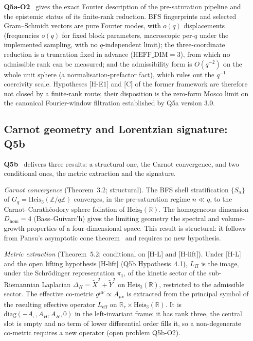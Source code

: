 \documentclass[11pt,a4paper]{article}
\theoremstyle{definition}
\newcommand{\Heis}{\mathrm{Heis}}
\newcommand{\Leff}{L_{\mathrm{eff}}}
\newcommand{\Lpi}{L_\Pi}
\newcommand{\geff}{g^{\mu\nu}}
\newcommand{\Atau}{A_\tau}
\newcommand{\AH}{A_H}
\newcommand{\Dhom}{D_{\mathrm{hom}}}
\begin{document}
      \textbf{Q5a-O2}~\cite{Beau2026q5ao2} gives the exact Fourier description of the
      pre-saturation pipeline and the epistemic status of its finite-rank reduction.
      BFS fingerprints and selected Gram--Schmidt vectors are pure Fourier modes, with $o(q)$
      displacements (frequencies $o(q)$ for fixed block parameters, macroscopic per-$q$ under
      the implemented sampling, with no $q$-independent limit); the three-coordinate reduction
      is a truncation fixed in advance ($\mathrm{HEFF\_DIM}=3$), from which no admissible
      rank can be measured; and the admissibility form is $O(q^{-2})$ on the whole unit sphere
      (a normalisation-prefactor fact), which rules out the $q^{-1}$ coercivity scale.
      Hypotheses [H-E1] and [C] of the former framework are therefore not closed by a
      finite-rank route; their disposition is the zero-form Mosco limit on the canonical
      Fourier-window filtration established by Q5a version 3.0.

    \subsection{Carnot geometry and Lorentzian signature: Q5b}
      \label{sec:q5b}

      \textbf{Q5b}~\cite{Beau2026q5b} delivers three results: a structural one, the Carnot
      convergence, and two conditional ones, the metric extraction and the signature.

      \textit{Carnot convergence} (Theorem~3.2; structural).
      The BFS shell stratification $\{S_n\}$ of $G_q = \Heis_3(\mathbb{Z}/q\mathbb{Z})$
      converges, in the pre-saturation regime $n \ll q$, to the Carnot--Carath\'{e}odory
      sphere foliation of $\Heis_3(\mathbb{R})$.
      The homogeneous dimension $\Dhom = 4$ (Bass--Guivarc'h) gives the limiting geometry
      the spectral and volume-growth properties of a four-dimensional space.
      This result is structural: it follows from Pansu's asymptotic cone theorem~\cite{Pansu1983} and requires
      no new hypothesis.

      \textit{Metric extraction} (Theorem~5.2; conditional on [H-L] and [H-lift]).
      Under [H-L] and the open lifting hypothesis [H-lift] (Q5b Hypothesis~4.1), $\Lpi$ is the image,
      under the Schr\"{o}dinger representation $\pi_1$, of the kinetic sector of the
      sub-Riemannian Laplacian $\Delta_H = \tilde{X}^2 + \tilde{Y}^2$ on $\Heis_3(\mathbb{R})$,
      restricted to the admissible sector.
      The effective co-metric $\geff \propto A_{\mu\nu}$ is extracted from the principal symbol
      of the resulting effective operator $\Leff$ on $\mathbb{R}_\tau \times \Heis_3(\mathbb{R})$.
      It is $\mathrm{diag}(-\Atau, \AH, \AH, 0)$ in the left-invariant frame: it has rank three,
      the central slot is empty and no term of lower differential order fills it, so a
      non-degenerate co-metric requires a new operator (open problem Q5b-O2).
\end{document}
